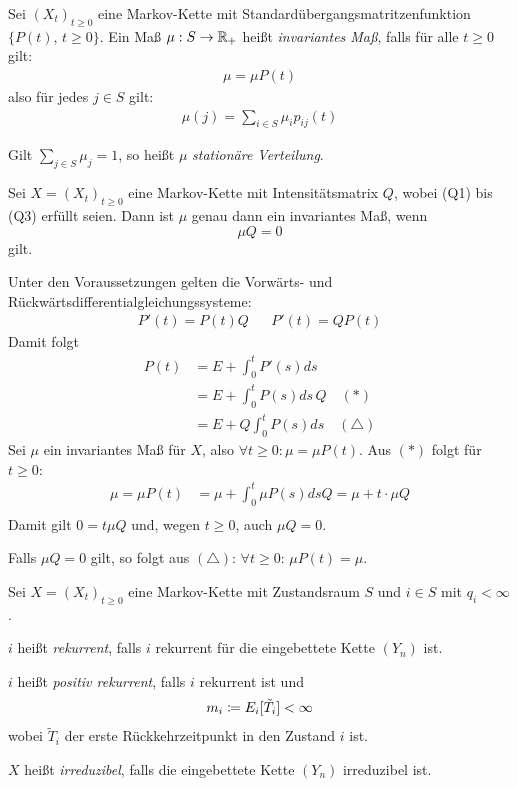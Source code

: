 \documentclass[a4paper,twoside,DIV15,BCOR12mm]{scrbook}
\begin{document}
\begin{definition}
Sei $(X_t)_{t\ge 0}$ eine Markov-Kette mit Standardübergangsmatritzenfunktion $\{P(t),\, t\ge 0\}$. Ein Maß $\mu:S\to \mathbb{R}_+$ heißt \emph{invariantes Maß}, falls für alle $t\ge 0$ gilt:
\begin{align*}
\mu = \mu P(t)
\end{align*}
also für jedes $j\in S$ gilt:
\begin{align*}
\mu(j) = \sum_{i\in S} \mu_i p_{ij}(t)
\end{align*}

Gilt $\sum_{j\in S}\mu_{j}=1$, so heißt $\mu$ \emph{stationäre Verteilung}.
\end{definition}

\begin{satz}
Sei $X=(X_t)_{t\ge 0}$ eine Markov-Kette mit Intensitätsmatrix $Q$, wobei (Q1) bis (Q3) erfüllt seien. Dann ist $\mu$ genau dann ein invariantes Maß, wenn
\[
\mu Q = 0
\]
gilt.
\end{satz}

\begin{beweis}
Unter den Voraussetzungen gelten die Vorwärts- und Rückwärtsdifferentialgleichungssysteme:
\begin{align*}
P'(t) = P(t) Q && P'(t)=QP(t)
\end{align*}
Damit folgt 
\begin{align*}
P(t) &= E + \int_{0}^t P'(s) ds \\
&= E + \int_0^t P(s)ds\, Q\quad(*)\\
&= E + Q\int_0^t P(s)ds\quad(\triangle)
\end{align*}
Sei $\mu$ ein invariantes Maß für $X$, also $\forall t\ge 0:\mu=\mu P(t)$. Aus $(*)$ folgt für $t\ge0$:
\begin{align*}
\mu = \mu P(t) &= \mu + \int_0^t\mu P(s) ds Q = \mu + t\cdot\mu Q\\
\end{align*}
Damit gilt $0 = t\mu Q$ und, wegen $t\ge 0$, auch $\mu Q = 0$.

Falls $\mu Q =0$ gilt, so folgt aus $(\triangle)$: $\forall t\ge 0$: $\mu P(t) = \mu$.
\end{beweis}

\begin{definition}
Sei $X=(X_t)_{t\ge0}$ eine Markov-Kette mit Zustandsraum $S$ und $i\in S$ mit $q_i<\infty$.
\begin{enuma}
\item $i$ heißt \emph{rekurrent}, falls $i$ rekurrent für die eingebettete Kette $(Y_n)$ ist.
\item $i$ heißt \emph{positiv rekurrent}, falls $i$ rekurrent ist und
\begin{align*}
m_i \da E_i[\tilde T_i]<\infty
\end{align*}
wobei $\tilde T_i$ der erste Rückkehrzeitpunkt in den Zustand $i$ ist.
\item $X$ heißt \emph{irreduzibel}, falls die eingebettete Kette $(Y_n)$ irreduzibel ist.
\end{enuma}
\end{definition}
\end{document}
